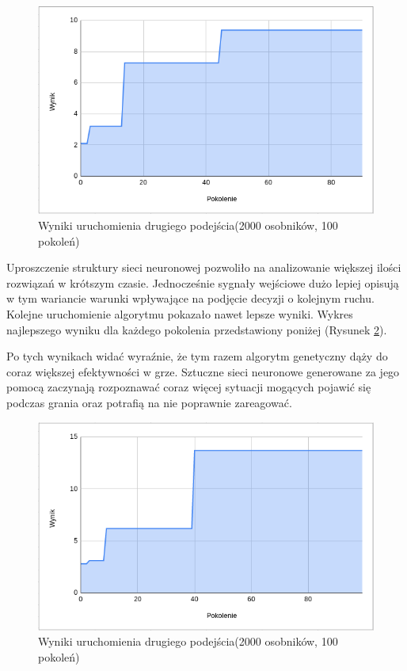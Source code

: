 \documentclass[12pt, oneside, a4paper]{report}
\begin{document}
\begin{figure}[h]
	\centering
	\includegraphics[width=13cm]{fig43.png}
	\caption{Wyniki uruchomienia drugiego podejścia(2000 osobników, 100 pokoleń) }
	\label{fig: 4.3}
\end{figure}

Uproszczenie struktury sieci neuronowej pozwoliło na analizowanie większej ilości rozwiązań w krótszym czasie. Jednocześnie sygnały wejściowe dużo lepiej opisują w tym wariancie warunki wpływające na podjęcie decyzji o kolejnym ruchu. Kolejne uruchomienie algorytmu pokazało nawet lepsze wyniki. Wykres najlepszego wyniku dla każdego pokolenia przedstawiony poniżej (Rysunek \ref{fig: 4.4}).

Po tych wynikach widać wyraźnie, że tym razem algorytm genetyczny dąży do coraz większej efektywności w grze. Sztuczne sieci neuronowe generowane za jego pomocą zaczynają rozpoznawać coraz więcej sytuacji mogących pojawić się podczas grania oraz potrafią na nie poprawnie zareagować.

\begin{figure}[h]
	\centering
	\includegraphics[width=13cm]{fig44.png}
	\caption{Wyniki uruchomienia drugiego podejścia(2000 osobników, 100 pokoleń)}
	\label{fig: 4.4}
\end{figure}
\end{document}
